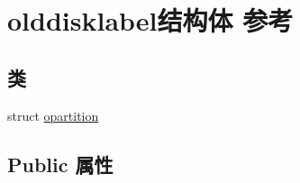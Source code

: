 \hypertarget{structolddisklabel}{}\section{olddisklabel结构体 参考}
\label{structolddisklabel}
\subsection*{类}
\begin{DoxyCompactItemize}
\item 
struct \hyperlink{structolddisklabel_1_1opartition}{opartition}
\end{DoxyCompactItemize}
\subsection*{Public 属性}
